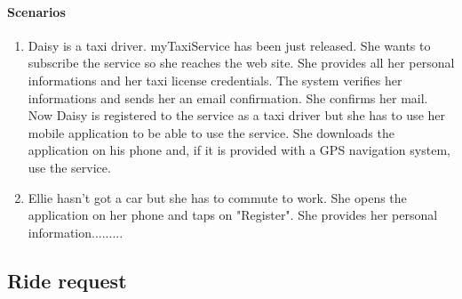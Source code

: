 \paragraph{Scenarios}
\begin{enumerate}
	\item Daisy is a taxi driver. myTaxiService has been just released. She wants to subscribe the service so she reaches the web site. She provides all her personal informations and her taxi license credentials. The system verifies her informations and sends her an email confirmation. She confirms her mail. Now Daisy is registered to the service as a taxi driver but she has to use her mobile application to be able to use the service. She downloads the application on his phone and, if it is provided with a GPS navigation system, use the service.
	\item Ellie hasn't got a car but she has to commute to work. She opens the application on her phone and taps on "Register". She provides her personal information.........
\end{enumerate}
\subsection{Ride request}
